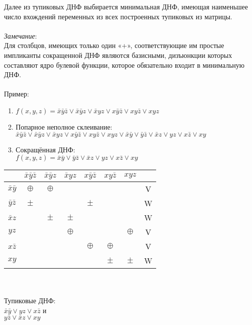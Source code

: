 \documentclass[a4paper, 12pt]{report}
\begin{document}
Далее из тупиковых ДНФ выбирается минимальная ДНФ, имеющая наименьшее число вхождений переменных из всех построенных тупиковых из матрицы.\\\\
\textit{Замечание}:\\
Для столбцов, имеющих только один «+», соответствующие им простые импликанты сокращенной ДНФ являются базисными, дизъюнкции которых составляют ядро булевой функции, которое обязательно входит в минимальную ДНФ.\\\\
Пример:
\begin{enumerate}
	\item $f(x, y, z) = \bar x \bar y \bar z \vee \bar x \bar y z \vee \bar x y z \vee x \bar y \bar z \vee x y \bar z \vee x y z$
	\item Попарное неполное склеивание:\\
	$\bar x \bar y \bar z \vee \bar x \bar y z \vee \bar x y z \vee x \bar y \bar z \vee x y \bar z \vee x y z \vee \bar x \bar y \vee \bar y \bar z \vee \bar x z \vee y z \vee x \bar z \vee x y$\\
	\item Сокращённая ДНФ:\\
	$f(x, y, z) = \bar x \bar y \vee \bar y \bar z \vee \bar x z \vee y z \vee x \bar z \vee x y$
\end{enumerate}
\begin{tabular}{|c|c|c|c|c|c|c|c|}
	\hline
	& $\bar x \bar y \bar z$ & $\bar x \bar y z$ & $\bar x y z$ & $x \bar y \bar z$ & $x y \bar z$ & $x y z$ &\\
	\hline
	$\bar x \bar y$ & $\oplus$&$\oplus$& & & & & V\\
	\hline
	$\bar y \bar z$ & $\pm$ &  &  & $\pm$ &  &  & W\\
	\hline
	$\bar x z$ &  & $\pm$ & $\pm$ &  &  &  & W\\ 
	\hline
	$ y z$ &  &  & $\oplus$ &  &  & $\oplus$ & V\\
	\hline
	$x \bar z$ &  &  &  & $\oplus$ & $\oplus$ &  & V\\
	\hline
	$x y$ &  &  &  &  & $\pm$ &  $\pm$ & W\\
	\hline
\end{tabular}\\\\
Тупиковые ДНФ:\\
$\bar x \bar y \vee y z \vee x \bar z$ и\\
$y \bar z \vee \bar x z \vee x y$

    
\end{document}
